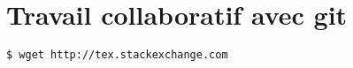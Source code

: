 \chapter{Travail collaboratif avec git}
\begin{lstlisting}[language=bash]
  $ wget http://tex.stackexchange.com
\end{lstlisting}
